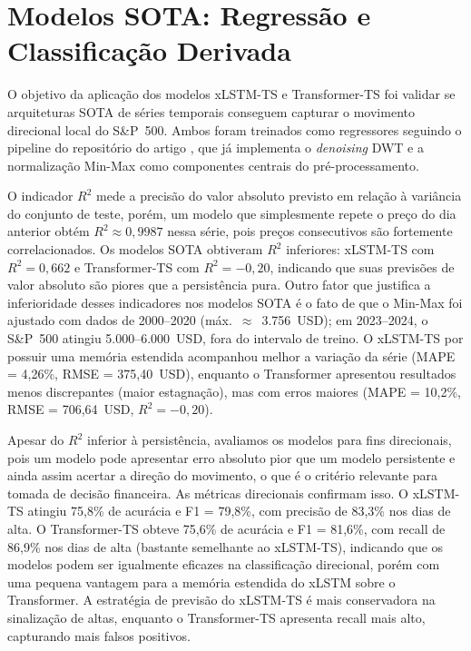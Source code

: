 \section{Modelos SOTA: Regressão e Classificação Derivada}
\label{sec:disc_sota}

O objetivo da aplicação dos modelos xLSTM-TS e Transformer-TS foi validar se arquiteturas SOTA de séries temporais conseguem capturar o movimento direcional local do S\&P~500. Ambos foram treinados como regressores seguindo o pipeline do repositório do artigo , que já implementa o \textit{denoising} DWT e a normalização Min-Max como componentes centrais do pré-processamento.

O indicador $R^2$ mede a precisão do valor absoluto previsto em relação à variância do conjunto de teste, porém, um modelo que simplesmente repete o preço do dia anterior obtém $R^2 \approx 0{,}9987$ nessa série, pois preços consecutivos são fortemente correlacionados. Os modelos SOTA obtiveram $R^2$ inferiores: xLSTM-TS com $R^2 = 0{,}662$ e Transformer-TS com $R^2 = -0{,}20$, indicando que suas previsões de valor absoluto são piores que a persistência pura. Outro fator que justifica a inferioridade desses indicadores nos modelos SOTA é o fato de que o Min-Max foi ajustado com dados de 2000--2020 (máx.\ $\approx$~3.756~USD); em 2023--2024, o S\&P~500 atingiu 5.000--6.000~USD, fora do intervalo de treino. O xLSTM-TS por possuir uma memória estendida acompanhou melhor a variação da série (MAPE = 4,26\%, RMSE = 375,40~USD), enquanto o Transformer apresentou resultados menos discrepantes (maior estagnação), mas com erros maiores (MAPE = 10,2\%, RMSE = 706,64~USD, $R^2 = -0{,}20$).

Apesar do $R^2$ inferior à persistência, avaliamos os modelos para fins direcionais, pois um modelo pode apresentar erro absoluto pior que um modelo persistente e ainda assim acertar a direção do movimento, o que é o critério relevante para tomada de decisão financeira. As métricas direcionais confirmam isso. O xLSTM-TS atingiu 75,8\% de acurácia e F1 = 79,8\%, com precisão de 83,3\% nos dias de alta. O Transformer-TS obteve 75,6\% de acurácia e F1 = 81,6\%, com recall de 86,9\% nos dias de alta (bastante semelhante ao xLSTM-TS), indicando que os modelos podem ser igualmente eficazes na classificação direcional, porém com uma pequena vantagem para a memória estendida do xLSTM sobre o Transformer. A estratégia de previsão do xLSTM-TS é mais conservadora na sinalização de altas, enquanto o Transformer-TS apresenta recall mais alto, capturando mais falsos positivos.


